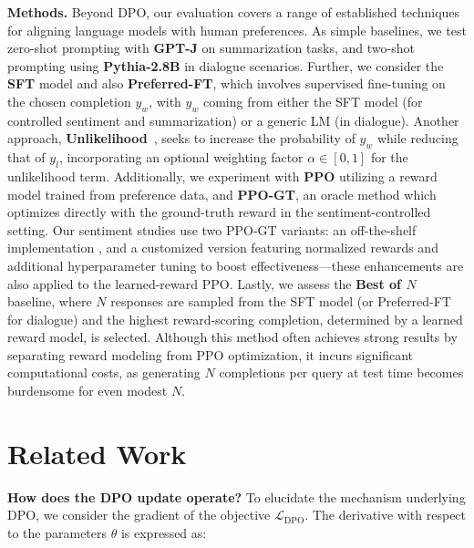 \textbf{Methods.} Beyond DPO, our evaluation covers a range of established techniques for aligning language models with human preferences. As simple baselines, we test zero-shot prompting with \textbf{GPT-J} \citep{gpt-j} on summarization tasks, and two-shot prompting using \textbf{Pythia-2.8B} \citep{biderman2023pythia} in dialogue scenarios. Further, we consider the \textbf{SFT} model and also \textbf{Preferred-FT}, which involves supervised fine-tuning on the chosen completion $y_w$, with $y_w$ coming from either the SFT model (for controlled sentiment and summarization) or a generic LM (in dialogue). Another approach, \textbf{Unlikelihood}~\citep{welleck2019neural}, seeks to increase the probability of $y_w$ while reducing that of $y_l$, incorporating an optional weighting factor $\alpha\in[0,1]$ for the unlikelihood term. Additionally, we experiment with \textbf{PPO} \citep{schulman2017proximal} utilizing a reward model trained from preference data, and \textbf{PPO-GT}, an oracle method which optimizes directly with the ground-truth reward in the sentiment-controlled setting. Our sentiment studies use two PPO-GT variants: an off-the-shelf implementation \cite{leandro_von_werra_2023_7790115}, and a customized version featuring normalized rewards and additional hyperparameter tuning to boost effectiveness—these enhancements are also applied to the learned-reward PPO. Lastly, we assess the \textbf{Best of $N$} baseline, where $N$ responses are sampled from the SFT model (or Preferred-FT for dialogue) and the highest reward-scoring completion, determined by a learned reward model, is selected. Although this method often achieves strong results by separating reward modeling from PPO optimization, it incurs significant computational costs, as generating $N$ completions per query at test time becomes burdensome for even modest $N$.

\section{Related Work}

\textbf{How does the DPO update operate?} To elucidate the mechanism underlying DPO, we consider the gradient of the objective $\mathcal{L}_\text{DPO}$. The derivative with respect to the parameters $\theta$ is expressed as:

